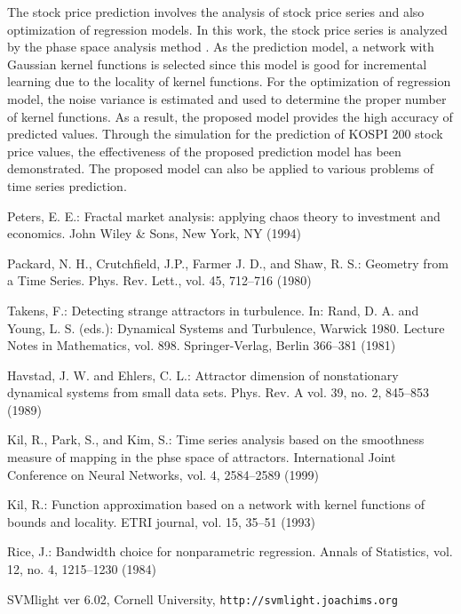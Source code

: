 \documentclass[runningheads,a4paper]{llncs}
\begin{document}
The stock price prediction involves the analysis of stock price series and also optimization of
regression models. In this work, the stock price series is analyzed by the phase space analysis
method \cite{Kil99}. As the prediction model, a network with Gaussian kernel functions is selected since this model is
good for incremental learning due to the locality of kernel functions. For the optimization of
regression model, the noise variance is estimated and used to determine the proper number of
kernel functions. As a result, the proposed model provides the high accuracy of predicted values.
Through the simulation for the prediction of KOSPI 200 stock price values, the effectiveness
of the proposed prediction model has been demonstrated.
The proposed model can also be applied to various problems of time
series prediction.

\begin{thebibliography}{4}

Peters, E. E.: Fractal market analysis: applying chaos theory to investment and economics.
John Wiley \& Sons, New York, NY (1994)

Packard, N. H., Crutchfield, J.P., Farmer J. D., and Shaw, R. S.: Geometry
from a Time Series. Phys. Rev. Lett., vol. 45, 712--716 (1980)

Takens, F.: Detecting strange attractors in turbulence. In: Rand,
D. A. and Young, L. S. (eds.): Dynamical Systems and Turbulence, Warwick
1980. Lecture Notes in Mathematics, vol. 898. Springer-Verlag,
Berlin 366--381 (1981)

Havstad, J. W. and Ehlers, C. L.: Attractor dimension of nonstationary
dynamical systems from small data sets. Phys. Rev. A
vol. 39, no. 2, 845--853 (1989)

Kil, R., Park, S., and Kim, S.: Time series analysis based on the smoothness measure of
mapping in the phse space of attractors. International Joint Conference on Neural Networks,
vol. 4, 2584--2589 (1999)

Kil, R.: Function approximation based on a network with kernel
functions of bounds and locality. ETRI journal, vol. 15, 35--51 (1993)

Rice, J.: Bandwidth choice for nonparametric regression. Annals of Statistics, vol. 12, no. 4, 1215--1230 (1984)

SVMlight ver 6.02, Cornell University, {\tt http://svmlight.joachims.org}

\end{thebibliography}
\end{document}
